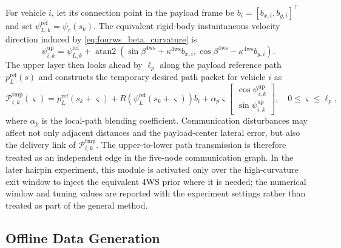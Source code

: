 \documentclass[twocolumn,3p,times,procedia]{elsarticle}
\begin{document}
For vehicle $i$, let its connection point in the payload frame be $b_i=[b_{x,i},b_{y,i}]^\top$ and set $\psi_{L,k}^{\mathrm{ref}}=\psi_r(s_k)$. The equivalent rigid-body instantaneous velocity direction induced by \eqref{eq:fourws_beta_curvature} is
\begin{equation}
\psi_{i,k}^{\mathrm{up}}=
\psi_{L,k}^{\mathrm{ref}}+
\operatorname{atan2}\!\left(
\sin\beta^{\mathrm{4ws}}+\kappa^{\mathrm{4ws}} b_{x,i},
\cos\beta^{\mathrm{4ws}}-\kappa^{\mathrm{4ws}} b_{y,i}
\right).
\label{eq:fourws_vehicle_heading}
\end{equation}
The upper layer then looks ahead by $\ell_p$ along the payload reference path $p_L^{\mathrm{ref}}(s)$ and constructs the temporary desired path packet for vehicle $i$ as
\begin{equation}
\mathcal P_{i,k}^{\mathrm{tmp}}(\varsigma)=
p_{L}^{\mathrm{ref}}(s_k+\varsigma)+
R\!\left(\psi_L^{\mathrm{ref}}(s_k+\varsigma)\right)b_i+
\alpha_p \varsigma
\begin{bmatrix}
\cos \psi_{i,k}^{\mathrm{up}}\\
\sin \psi_{i,k}^{\mathrm{up}}
\end{bmatrix},
\quad 0\le\varsigma\le\ell_p ,
\label{eq:fourws_local_path}
\end{equation}
where $\alpha_p$ is the local-path blending coefficient. Communication disturbances may affect not only adjacent distances and the payload-center lateral error, but also the delivery link of $\mathcal P_{i,k}^{\mathrm{tmp}}$. The upper-to-lower path transmission is therefore treated as an independent edge in the five-node communication graph. In the later hairpin experiment, this module is activated only over the high-curvature exit window to inject the equivalent 4WS prior where it is needed; the numerical window and tuning values are reported with the experiment settings rather than treated as part of the general method.

\subsection{Offline Data Generation}
\end{document}
